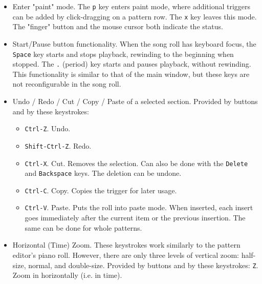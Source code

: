    \begin{itemize}
      \item Enter "paint" mode.
         The \texttt{p} key enters paint mode, where additional triggers
         can be added by click-dragging on a pattern row.
         The \texttt{x} key leaves this mode.
         The "finger" button and the mouse cursor both indicate the status.
      \item Start/Pause button functionality.
         When the song roll has keyboard focus,
         the \texttt{Space} key starts and stops playback, rewinding to the
         beginning when stopped.
         The \texttt{.} (period) key starts and pauses playback, without
         rewinding.
         This functionality is similar to that of the main window, but
         these keys are not reconfigurable in the song roll.
      \item Undo / Redo / Cut / Copy / Paste of a selected section.
         Provided by buttons and by these keystrokes:
         \begin{itemize}
            \item \texttt{Ctrl-Z}. Undo.
            \item \texttt{Shift-Ctrl-Z}. Redo.
            \item \texttt{Ctrl-X}. Cut.  Removes the selection.
            Can also be done with the \texttt{Delete} and
            \texttt{Backspace} keys.
            The deletion can be undone.
            \item \texttt{Ctrl-C}. Copy.
            Copies the trigger for later usage.
            \item \texttt{Ctrl-V}. Paste.
            Puts the roll into paste mode.
            When inserted, each insert goes immediately
            after the current item or the previous insertion.  The same can be
            done for whole patterns.
         \end{itemize}
      \item Horizontal (Time) Zoom.  These keystrokes work similarly to the
      pattern editor's piano roll.  However, there are only three levels of
      vertical zoom:  half-size, normal, and double-size.
         Provided by buttons and by these keystrokes:
         \texttt{Z}. Zoom in horizontally (i.e. in time).

\end{itemize}
